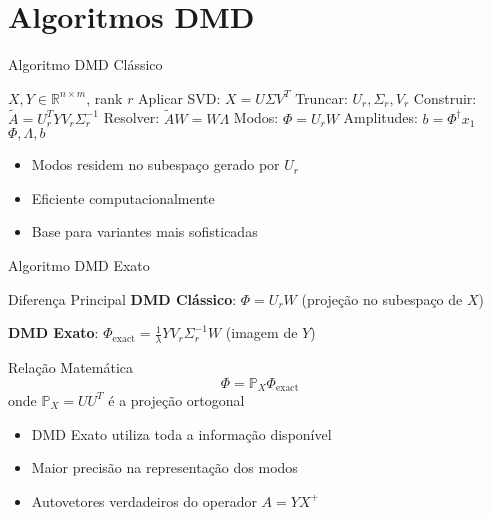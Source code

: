 \documentclass[aspectratio=169]{beamer}
\begin{document}
\section{Algoritmos DMD}

\begin{frame}{Algoritmo DMD Clássico}
    \begin{algorithm}[H]
        \caption{DMD Clássico}
        \begin{algorithmic}[1]
            \REQUIRE $X, Y \in \mathbb{R}^{n \times m}$, rank $r$
            \STATE Aplicar SVD: $X = U\Sigma V^T$
            \STATE Truncar: $U_r, \Sigma_r, V_r$
            \STATE Construir: $\tilde{A} = U_r^T Y V_r \Sigma_r^{-1}$
            \STATE Resolver: $\tilde{A}W = W\Lambda$
            \STATE Modos: $\Phi = U_r W$
            \STATE Amplitudes: $b = \Phi^{\dagger} x_1$
            \RETURN $\Phi, \Lambda, b$
        \end{algorithmic}
    \end{algorithm}
    
    \begin{itemize}
        \item Modos residem no subespaço gerado por $U_r$
        \item Eficiente computacionalmente
        \item Base para variantes mais sofisticadas
    \end{itemize}
\end{frame}

\begin{frame}{Algoritmo DMD Exato}
    \begin{block}{Diferença Principal}
        \textbf{DMD Clássico}: $\Phi = U_r W$ (projeção no subespaço de $X$)
        
        \textbf{DMD Exato}: $\Phi_{\text{exact}} = \frac{1}{\lambda} Y V_r \Sigma_r^{-1} W$ (imagem de $Y$)
    \end{block}
    
    \begin{block}{Relação Matemática}
        \begin{equation}
            \Phi = \mathbb{P}_X \Phi_{\text{exact}}
        \end{equation}
        onde $\mathbb{P}_X = UU^T$ é a projeção ortogonal
    \end{block}
    
    \begin{itemize}
        \item DMD Exato utiliza toda a informação disponível
        \item Maior precisão na representação dos modos
        \item Autovetores verdadeiros do operador $A = YX^+$
    \end{itemize}
\end{frame}
\end{document}
